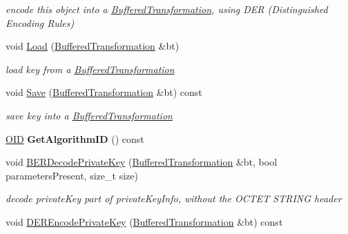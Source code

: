 \begin{DoxyCompactItemize}
\begin{DoxyCompactList}\small\item\em encode this object into a \hyperlink{class_buffered_transformation}{BufferedTransformation}, using DER (Distinguished Encoding Rules) \item\end{DoxyCompactList}\item 
void \hyperlink{class_invertible_r_s_a_function_ad8a540a6369b9043d082b0dc38b99d4b}{Load} (\hyperlink{class_buffered_transformation}{BufferedTransformation} \&bt)
\begin{DoxyCompactList}\small\item\em load key from a \hyperlink{class_buffered_transformation}{BufferedTransformation} \item\end{DoxyCompactList}\item 
\hypertarget{class_invertible_r_s_a_function_a09ea42eb393e6145171124ccdbc8883f}{
void \hyperlink{class_invertible_r_s_a_function_a09ea42eb393e6145171124ccdbc8883f}{Save} (\hyperlink{class_buffered_transformation}{BufferedTransformation} \&bt) const }
\label{class_invertible_r_s_a_function_a09ea42eb393e6145171124ccdbc8883f}

\begin{DoxyCompactList}\small\item\em save key into a \hyperlink{class_buffered_transformation}{BufferedTransformation} \item\end{DoxyCompactList}\item 
\hypertarget{class_invertible_r_s_a_function_aaa41122f95ad8d55faff49bc1640ebc0}{
\hyperlink{class_o_i_d}{OID} {\bfseries GetAlgorithmID} () const }
\label{class_invertible_r_s_a_function_aaa41122f95ad8d55faff49bc1640ebc0}

\item 
\hypertarget{class_invertible_r_s_a_function_aec98bbad739fc4536151f2ab5eedf78c}{
void \hyperlink{class_invertible_r_s_a_function_aec98bbad739fc4536151f2ab5eedf78c}{BERDecodePrivateKey} (\hyperlink{class_buffered_transformation}{BufferedTransformation} \&bt, bool parametersPresent, size\_\-t size)}
\label{class_invertible_r_s_a_function_aec98bbad739fc4536151f2ab5eedf78c}

\begin{DoxyCompactList}\small\item\em decode privateKey part of privateKeyInfo, without the OCTET STRING header \item\end{DoxyCompactList}\item 
\hypertarget{class_invertible_r_s_a_function_a0fd9c43c688c787d1bc686c254c577ef}{
void \hyperlink{class_invertible_r_s_a_function_a0fd9c43c688c787d1bc686c254c577ef}{DEREncodePrivateKey} (\hyperlink{class_buffered_transformation}{BufferedTransformation} \&bt) const }
\label{class_invertible_r_s_a_function_a0fd9c43c688c787d1bc686c254c577ef}


\end{DoxyCompactItemize}
